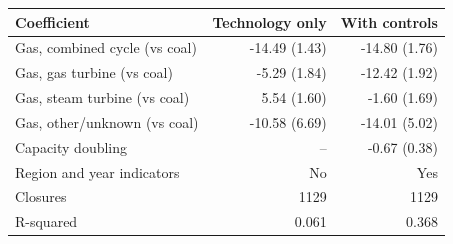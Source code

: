 \begin{tabular}{lrr}
\toprule
Coefficient & Technology only & With controls \\
\midrule
Gas, combined cycle (vs coal) & -14.49 (1.43) & -14.80 (1.76) \\
Gas, gas turbine (vs coal) & -5.29 (1.84) & -12.42 (1.92) \\
Gas, steam turbine (vs coal) & 5.54 (1.60) & -1.60 (1.69) \\
Gas, other/unknown (vs coal) & -10.58 (6.69) & -14.01 (5.02) \\
Capacity doubling & -- & -0.67 (0.38) \\
\midrule
Region and year indicators & No & Yes \\
Closures & 1129 & 1129 \\
R-squared & 0.061 & 0.368 \\
\bottomrule
\end{tabular}
